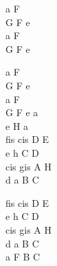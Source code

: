 \begin{chord}
\footnotesize{
    a F\\
    G F e\\
    a F\\
    G F e

    a F\\
    G F e\\
    a F\\
    G F e a\\
    e H a\\
    fis cis D E\\
    e h C D\\
    cis gis A H\\
    d a B C

    fis cis D E\\
    e h C D\\
    cis gis A H\\
    d a B C\\
    a F B C
}
\end{chord}